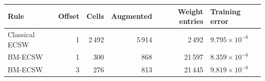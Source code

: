 \begin{tabular}{@{}lrrrrl@{}}
\toprule
Rule & Offset & Cells & Augmented & Weight entries & Training error\\
\midrule
Classical ECSW & 1 & 2\,492 & 5\,914 & 2\,492 & $9.795\times10^{-6}$\\
BM-ECSW & 1 & 300 & 868 & 21\,597 & $8.359\times10^{-6}$\\
BM-ECSW & 3 & 276 & 813 & 21\,445 & $9.819\times10^{-6}$\\
\bottomrule
\end{tabular}
